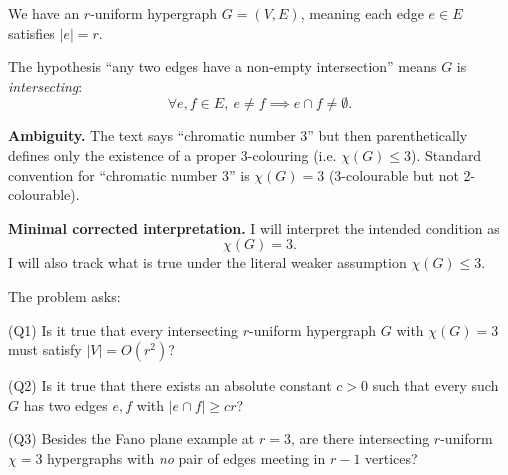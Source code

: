 We have an $r$-uniform hypergraph $G=(V,E)$, meaning each edge $e\in E$ satisfies $|e|=r$.

The hypothesis ``any two edges have a non-empty intersection'' means $G$ is \emph{intersecting}:
\[
\forall e,f\in E,\ e\neq f \implies e\cap f\neq \emptyset.
\]

\textbf{Ambiguity.} The text says ``chromatic number $3$'' but then parenthetically defines only the existence of a proper $3$-colouring (i.e. $\chi(G)\le 3$). Standard convention for ``chromatic number $3$'' is $\chi(G)=3$ (3-colourable but not 2-colourable).

\textbf{Minimal corrected interpretation.} I will interpret the intended condition as
\[
\chi(G)=3.
\]
I will also track what is true under the literal weaker assumption $\chi(G)\le 3$.

The problem asks:

(Q1) Is it true that every intersecting $r$-uniform hypergraph $G$ with $\chi(G)=3$ must satisfy $|V|=O(r^2)$?

(Q2) Is it true that there exists an absolute constant $c>0$ such that every such $G$ has two edges $e,f$ with $|e\cap f|\ge c r$?

(Q3) Besides the Fano plane example at $r=3$, are there intersecting $r$-uniform $\chi=3$ hypergraphs with \emph{no} pair of edges meeting in $r-1$ vertices?
